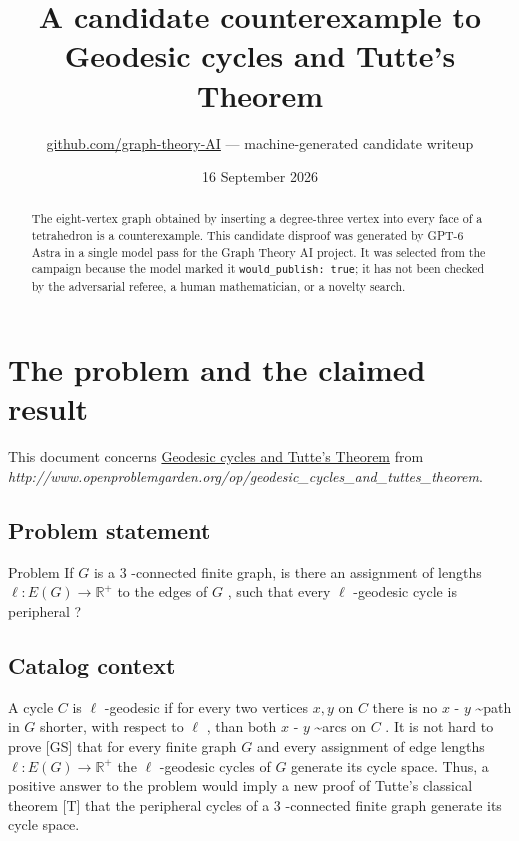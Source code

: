 \documentclass[
  11pt,
  a4paper,
]{article}
\title{A candidate counterexample to Geodesic cycles and Tutte's
Theorem}
\author{\href{https://github.com/graph-theory-AI}{github.com/graph-theory-AI}
--- machine-generated candidate writeup}
\date{16 September 2026}
\begin{document}
\maketitle
\begin{abstract}
The eight-vertex graph obtained by inserting a degree-three vertex into
every face of a tetrahedron is a counterexample. This candidate disproof
was generated by GPT-6 Astra in a single model pass for the Graph Theory
AI project. It was selected from the campaign because the model marked
it \texttt{would\_publish:\ true}; it has not been checked by the
adversarial referee, a human mathematician, or a novelty search.
\end{abstract}

\section{The problem and the claimed
result}\label{the-problem-and-the-claimed-result}

This document concerns
\href{https://graph-theory-ai.github.io/graph-conjectures/op/geodesic_cycles_and_tuttes_theorem/}{Geodesic
cycles and Tutte's Theorem} from
\emph{http://www.openproblemgarden.org/op/geodesic\_cycles\_and\_tuttes\_theorem}.

\subsection{Problem statement}\label{problem-statement}

Problem If \(G\) is a \(3\) -connected finite graph, is there an
assignment of lengths \(\ell: E(G) \to \mathbb{R}^+\) to the edges of
\(G\) , such that every \(\ell\) -geodesic cycle is peripheral ?

\subsection{Catalog context}\label{catalog-context}

A cycle \(C\) is \(\ell\) -geodesic if for every two vertices \(x,y\) on
\(C\) there is no \(x\) - \(y\) \textasciitilde path in \(G\) shorter,
with respect to \(\ell\) , than both \(x\) - \(y\) \textasciitilde arcs
on \(C\) . It is not hard to prove {[}GS{]} that for every finite graph
\(G\) and every assignment of edge lengths
\(\ell: E(G) \to \mathbb{R}^+\) the \(\ell\) -geodesic cycles of \(G\)
generate its cycle space. Thus, a positive answer to the problem would
imply a new proof of Tutte's classical theorem {[}T{]} that the
peripheral cycles of a \(3\) -connected finite graph generate its cycle
space.
\end{document}
